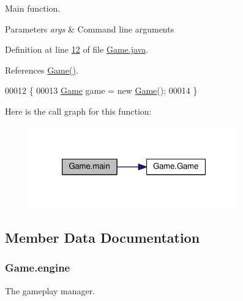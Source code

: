 Main function. 


\begin{DoxyParams}{Parameters}
{\em args} & Command line arguments \\
\hline
\end{DoxyParams}


Definition at line \hyperlink{Game_8java_source_l00012}{12} of file \hyperlink{Game_8java_source}{Game.\-java}.



References \hyperlink{Game_8java_source_l00029}{Game()}.


\begin{DoxyCode}
00012                                            \{
00013         \hyperlink{classGame}{Game} game = \textcolor{keyword}{new} \hyperlink{classGame_a2e034e53e9c032964ecd2a831b29a616}{Game}();
00014     \}
\end{DoxyCode}


Here is the call graph for this function\-:\nopagebreak
\begin{figure}[H]
\begin{center}
\leavevmode
\includegraphics[width=256pt]{classGame_ae52595a27ac1b327b05db2129ad81fca_cgraph}
\end{center}
\end{figure}




\subsection{Member Data Documentation}
\hypertarget{classGame_a899fc9c2339c51abd4594b6a5e44284f}{
\subsubsection[{engine}]{ Game.\-engine\hspace{0.3cm}{\ttfamily [private]}}}\label{classGame_a899fc9c2339c51abd4594b6a5e44284f}


The gameplay manager. 



